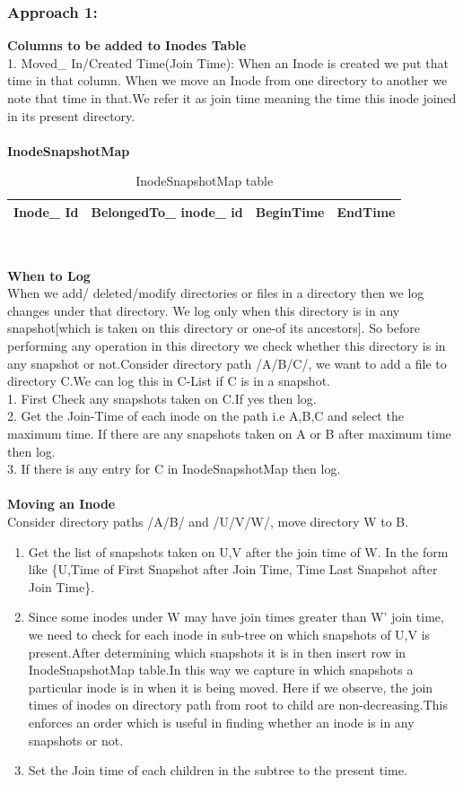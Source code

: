 \subsubsection{Approach 1:}
\textbf{Columns to be added to Inodes Table}\\
1. Moved\_ In/Created Time(Join Time): When an Inode is created we put that time in that column. When we move an Inode from one directory to another we note that time in that.We refer it as join time meaning the time this inode joined in its present directory.\\\\
\textbf{InodeSnapshotMap}\\
\begin{table}[h!]
\begin{tabular}{|c|c|c|c|}
\hline
Inode\_ Id&
BelongedTo\_ inode\_ id&
BeginTime&
EndTime\\
\hline
\end{tabular}\\
\caption{InodeSnapshotMap table}
\label{movedPaths}
\end{table}


\textbf{When to Log}\\
 When we add/ deleted/modify directories or files in a directory then we log changes under that directory. We log only when this directory is in any snapshot[which is taken on this directory or one-of its ancestors]. So before performing any operation in this directory we check whether this directory is in any snapshot or not.Consider directory path /A/B/C/, we want to add a file to directory C.We can log this in C-List if C is in a snapshot. \\
 1. First Check any snapshots taken on C.If yes then log.\\
 2. Get the Join-Time of each inode on the path i.e A,B,C and select the maximum time. If there are any snapshots taken on A or B after maximum time then log.\\
 3. If there is any entry for C in InodeSnapshotMap then log.\\
\\
\textbf{Moving an Inode}\\ 
Consider directory paths /A/B/ and /U/V/W/, move directory W to B.
\begin{enumerate}
\item Get the list of snapshots taken on U,V after the join time of W. In the form like
\{U,Time of First Snapshot after Join Time, Time Last Snapshot after Join Time\}.
\item Since some inodes under W may have join times greater than W' join time, we need to check for each inode in sub-tree on which snapshots of U,V is present.After determining which snapshots it is in then insert row in InodeSnapshotMap table.In this way we capture in which snapshots a particular inode is in when it is being moved. Here if we observe, the join times of inodes on directory path from root to child are non-decreasing.This enforces an order which is useful in finding whether an inode is in any snapshots or not.
\item Set the Join time of each children in the subtree to the present time.
\end{enumerate}

